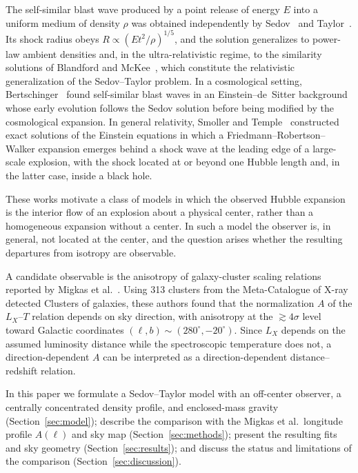 \documentclass[11pt,letterpaper]{article}
\numberwithin{equation}{section}
\begin{document}
The self-similar blast wave produced by a point release of energy $E$ into a
uniform medium of density $\rho$ was obtained independently by
Sedov~\citep{Sedov1946} and Taylor~\citep{Taylor1950}. Its shock radius obeys
$R\propto(Et^2/\rho)^{1/5}$, and the solution generalizes to power-law ambient
densities and, in the ultra-relativistic regime, to the similarity solutions of
Blandford and McKee~\citep{BlandfordMcKee1976}, which constitute the relativistic
generalization of the Sedov--Taylor problem. In a cosmological setting,
Bertschinger~\citep{Bertschinger1983} found self-similar blast waves in an
Einstein--de~Sitter background whose early evolution follows the Sedov
solution before being modified by the cosmological expansion. In general
relativity, Smoller and Temple~\citep{SmollerTemple2000,SmollerTemple2003}
constructed exact solutions of the Einstein equations in which a
Friedmann--Robertson--Walker expansion emerges behind a shock wave at the
leading edge of a large-scale explosion, with the shock located at or beyond
one Hubble length and, in the latter case, inside a black hole.

These works motivate a class of models in which the observed Hubble expansion
is the interior flow of an explosion about a physical center, rather than a
homogeneous expansion without a center. In such a model the observer is, in
general, not located at the center, and the question arises whether the
resulting departures from isotropy are observable.

A candidate observable is the anisotropy of galaxy-cluster scaling relations
reported by Migkas et al.~\citep{Migkas2020}. Using 313 clusters from the
Meta-Catalogue of X-ray detected Clusters of galaxies, these authors found that
the normalization $A$ of the $L_X$--$T$ relation depends on sky direction, with
anisotropy at the $\gtrsim4\sigma$ level toward Galactic coordinates
$(\ell,b)\sim(280^\circ,-20^\circ)$. Since $L_X$ depends on the assumed luminosity
distance while the spectroscopic temperature does not, a direction-dependent
$A$ can be interpreted as a direction-dependent distance--redshift relation.

In this paper we formulate a Sedov--Taylor model with an off-center observer,
a centrally concentrated density profile, and enclosed-mass gravity
(Section~\ref{sec:model}); describe the comparison with the Migkas et al.\
longitude profile $A(\ell)$ and sky map (Section~\ref{sec:methods}); present
the resulting fits and sky geometry (Section~\ref{sec:results}); and discuss
the status and limitations of the comparison (Section~\ref{sec:discussion}).
\end{document}
